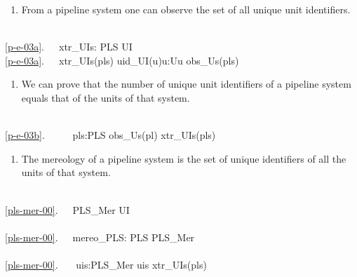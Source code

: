 \mnewfoil
\begin{enumerate}\setei
\item \label{p-e-03a} From a pipeline system one can observe the set
  of all unique unit identifiers.
\savei\end{enumerate}


\bp
\>\ \\
\ref{p-e-03a}.\ \ \ xtr\_UIs: PLS {\RIGHTARROW} UI\\
\ref{p-e-03a}.\ \ \ xtr\_UIs(pls) {\IS} {\LBRACE}uid\_UI(u){\BAR}u:U{\RDOT}u {\ISIN} obs\_Us(pls){\RBRACE}
\ep

\begin{enumerate}\setei
\item \label{p-e-03b} We can prove that the number of unique unit
                      identifiers of a pipeline system equals that
                      of the units of that system.
\savei\end{enumerate}


\bp
\>\ \\
\ref{p-e-03b}.\ \ \ \ \ {\ALL} pls:PLS{\RDOT} obs\_Us(pl){\EQ} xtr\_UIs(pls)
\ep

\label{PLS Mereology}\LLLL\HHHH


\begin{enumerate}\setei
\item \label{pls-mer-00} The mereology of a pipeline system is the set
  of unique identifiers of all the units of that system.
\savei\end{enumerate}

\bp
{}\\
\ref{pls-mer-00}.\ \ \ PLS\_Mer {\EQ} UI\\
\\
\ref{pls-mer-00}.\ \ \ mereo\_PLS: PLS {\RIGHTARROW} PLS\_Mer\\
\\
\ref{pls-mer-00}.\ \ \ {\ALL} uis:PLS\_Mer {\RDOT} uis {\EQ}  xtr\_UIs(pls)
\ep

